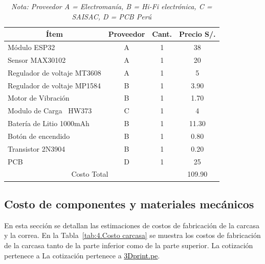 \begin{table}[H]
\centering
\caption{Costo de componentes electrónicos}
\label{tab:4.Costo componentes}
\begin{tabular}{|l|c|c|c|} 
\hline
\multicolumn{1}{|c|}{Ítem}  & Proveedor & Cant. & Precio S/.  \\ 
\hline
Módulo ESP32                & A         & 1    & 38          \\ 
\hline
Sensor MAX30102             & A         & 1    & 20          \\ 
\hline
Regulador de voltaje MT3608 & A         & 1    & 5           \\ 
\hline
Regulador de voltaje MP1584 & B         & 1    & 3.90        \\ 
\hline
Motor de Vibración          & B         & 1    & 1.70        \\ 
\hline
Modulo de Carga~ HW373      & C         & 1    & 4           \\ 
\hline
Batería de Litio 1000mAh    & B         & 1    & 11.30       \\ 
\hline
Botón de encendido          & B         & 1    & 0.80        \\ 
\hline
Transistor 2N3904           & B         & 1    & 0.20        \\ 
\hline
PCB                         & D         & 1    & 25          \\ 
\hline
\multicolumn{3}{|c|}{Costo Total}              & 109.90  \\
\hline

\end{tabular}
\caption*{\textit{Nota: Proveedor A = Electromanía, B = Hi-Fi electrónica, C = SAISAC, D = PCB Perú}}
\end{table}
\subsection{Costo de componentes y materiales mecánicos}

En esta sección se detallan las estimaciones de costos de fabricación de la carcasa y la correa. En la Tabla~\ref{tab:4.Costo carcasa} se muestra los costos de fabricación de la carcasa tanto de la parte inferior como de la parte superior. La cotización pertenece a La cotización pertenece a \href{https://3dprint.pe}{\textcolor{black}{3Dprint.pe}}.

